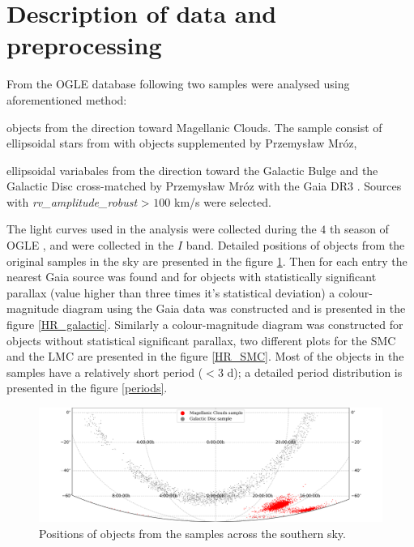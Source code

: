 \documentclass{pracalicmgr}
\newenvironment{itemize*}%
  {\vspace{-\topsep}
    \begin{itemize}%
    \setlength{\itemsep}{0pt}%
    \setlength{\parskip}{0pt}}%
  {\end{itemize}
  \vspace{-\topsep}}
\begin{document}
\section{Description of data and preprocessing}
From the OGLE \citet{udalski_optical_1992} database following two samples were analysed using aforementioned method:
\begin{itemize*}
    \item objects from the direction toward Magellanic Clouds. The sample consist of ellipsoidal stars from \citet{pawlak_ogle_2016} with objects supplemented 
    by Przemysław Mróz, 
    \item ellipsoidal variabales from the direction toward the Galactic Bulge and the Galactic Disc cross-matched by Przemysław Mróz with the Gaia DR3 
    \citep{gaia_collaboration_gaia_2022}. Sources with  {\it{rv\_amplitude\_robust}} > $100$ km/s were selected.
\end{itemize*}
The light curves used in the analysis were collected during the $4$ th season of OGLE \citet{udalski_ogle-iv_2015},
and were collected in the $I$ band.
Detailed positions of objects from the original samples in the sky are presented in the figure \ref{map}. Then for each entry the nearest Gaia source
was found and for objects with statistically significant parallax (value higher than three times it's statistical deviation) a colour-magnitude
diagram using the Gaia data was constructed and is presented in the figure \ref{HR_galactic}. Similarly a colour-magnitude diagram was constructed for
objects without statistical significant parallax, two different plots for the SMC and the LMC are presented in the figure \ref{HR_SMC}.
Most of the objects in the samples have a relatively short period ($<3$ d); a detailed period distribution
is presented in the figure \ref{periods}.
\begin{figure}
    \begin{center}
        \includegraphics[scale=0.52]{plots/map_sample.png}
    \end{center}
    \caption{Positions of objects from the samples across the southern sky.}
    \label{map}
\end{figure}
\end{document}

